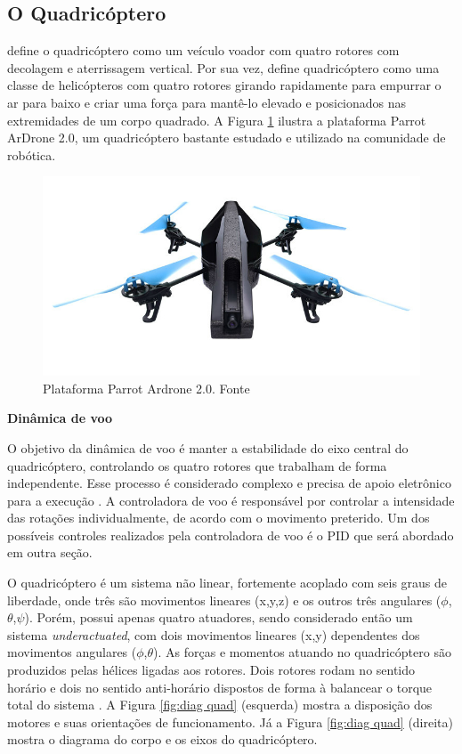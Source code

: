 \documentclass[a4paper, 12pt]{article}
\begin{document}
\subsection{O Quadricóptero}

\cite{Salih2010} define o quadricóptero como um veículo voador com quatro rotores com decolagem e aterrissagem vertical. Por sua vez, \cite{Gibiansky2010} define quadricóptero como uma classe de helicópteros com quatro rotores girando rapidamente para empurrar o ar para baixo e criar uma força para mantê-lo elevado e posicionados nas extremidades de um corpo quadrado. A Figura \ref{fig:quad} ilustra a plataforma Parrot ArDrone 2.0, um quadricóptero bastante estudado e utilizado na comunidade de robótica.

\begin{figure}[h]
	\centering
		\includegraphics[scale=0.4]{img/parrot_drone.jpg}
	\caption{Plataforma Parrot Ardrone 2.0. Fonte \cite{ardrone}}
	\label{fig:quad}
\end{figure}

\noindent\textbf{Dinâmica de voo}

O objetivo da dinâmica de voo é manter a estabilidade do eixo central do quadricóptero,  controlando os quatro rotores que trabalham de forma independente. Esse processo é considerado complexo e precisa de apoio eletrônico para a execução \cite{Gibiansky2010}. A controladora de voo é responsável por controlar a intensidade das rotações individualmente, de acordo com o movimento preterido. Um dos possíveis controles realizados pela controladora de voo é o PID que será abordado em outra seção.

O quadricóptero é um sistema não linear, fortemente acoplado com seis graus de liberdade, onde três são movimentos lineares (x,y,z) e os outros três angulares ($\phi$,$\theta$,$\psi$). Porém, possui apenas quatro atuadores, sendo considerado então um sistema \textit{underactuated}, com dois movimentos lineares (x,y) dependentes dos movimentos angulares ($\phi$,$\theta$). As forças e momentos atuando no quadricóptero são produzidos pelas hélices ligadas aos rotores. Dois rotores rodam no sentido horário e dois no sentido anti-horário dispostos de forma à balancear o torque total do sistema \cite{Mian2008}. A Figura \ref{fig:diag quad} (esquerda) mostra a disposição dos motores e suas orientações de funcionamento. Já a Figura \ref{fig:diag quad} (direita)  mostra o diagrama do corpo e os eixos do quadricóptero.
\end{document}
